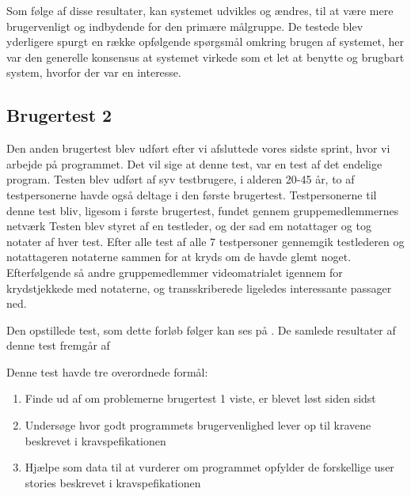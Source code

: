 Som følge af disse resultater, kan systemet udvikles og ændres, til at være mere brugervenligt og indbydende for den primære målgruppe.
De testede blev yderligere spurgt en række opfølgende spørgsmål omkring brugen af systemet, her var den generelle konsensus at systemet virkede som et let at benytte og brugbart system, hvorfor der var en interesse.

\subsection{Brugertest 2}
Den anden brugertest blev udført efter vi afsluttede vores sidste sprint, hvor vi arbejde på programmet.
Det vil sige at denne test, var en test af det endelige program.
Testen blev udført af syv testbrugere, i alderen 20-45 år, to af testpersonerne havde også deltage i den første brugertest.
Testpersonerne til denne test bliv, ligesom i første brugertest, fundet gennem gruppemedlemmernes netværk 
Testen blev styret af en testleder, og der sad em notattager og tog notater af hver test.
Efter alle test af alle 7 testpersoner gennemgik testlederen og notattageren notaterne sammen for at kryds om de havde glemt noget.
Efterfølgende så andre gruppemedlemmer videomatrialet igennem for krydstjekkede med notaterne, og transskriberede ligeledes interessante passager ned.

Den opstillede test, som dette forløb følger kan ses på .
De samlede resultater af denne test fremgår af  

Denne test havde tre overordnede formål:
\begin{enumerate}
   \item Finde ud af om problemerne brugertest 1 viste, er blevet løst siden sidst
   \item Undersøge hvor godt programmets brugervenlighed lever op til kravene beskrevet i kravspefikationen
   \item Hjælpe som data til at vurderer om programmet opfylder de forskellige user stories beskrevet i kravspefikationen 
\end{enumerate}

